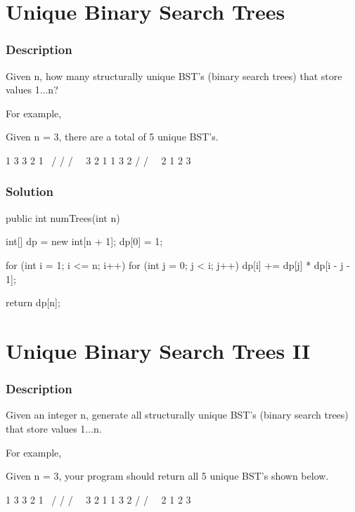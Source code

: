 \newpage

\section{Unique Binary Search Trees} %

\subsubsection{Description}
Given n, how many structurally unique BST's (binary search trees) that store values 1...n?

For example,

Given n = 3, there are a total of 5 unique BST's.
\begin{Code}
   1         3     3      2      1
    \       /     /      / \      \
     3     2     1      1   3      2
    /     /       \                 \
   2     1         2                 3
\end{Code}

\subsubsection{Solution}

\begin{Code}
public int numTrees(int n) {
    int[] dp = new int[n + 1];
    dp[0] = 1;

    for (int i = 1; i <= n; i++) {
        for (int j = 0; j < i; j++) {
            dp[i] += dp[j] * dp[i - j - 1];
        }
    }

    return dp[n];
}
\end{Code}

\newpage

\section{Unique Binary Search Trees II} %

\subsubsection{Description}
Given an integer n, generate all structurally unique BST's (binary search trees) that store values 1...n.

For example,

Given n = 3, your program should return all 5 unique BST's shown below.
\begin{Code}
   1         3     3      2      1
    \       /     /      / \      \
     3     2     1      1   3      2
    /     /       \                 \
   2     1         2                 3
\end{Code}

